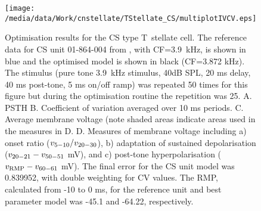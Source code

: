 
\begin{figure}[htb]
\centering%
\texttt{[image: /media/data/Work/cnstellate/TStellate\_CS/multiplotIVCV.eps]}
\caption[CS T~stellate Optimisation results]{Optimisation results for the CS type T~stellate cell.
The reference data for CS unit 01-864-004 from  \citep{PaoliniClareyEtAl:2005}, with CF=3.9~kHz, is shown in blue and the     optimised model is shown in black (CF=3.872 kHz).
The stimulus (pure tone  3.9~kHz stimulus, 40dB SPL, 20 ms delay, 40 ms post-tone, 5 ms on/off ramp)  was repeated 50 times for this figure but during the optimisation routine the  repetition was 25.
A. PSTH B. Coefficient of variation averaged over 10 ms periods.
C. Average membrane voltage (note shaded areas indicate areas used in the measures in D.
D. Measures of membrane voltage including a) onset ratio ($v_{\rm 5-10}/v_{\rm 20-30}$), b) adaptation of sustained depolarisation ($v_{\rm 20-21} - v_{\rm 50-51}$ mV), and c) post-tone hyperpolarisation ($v_{\rm RMP} - v_{\rm 60-61}$ mV).
The final error for the CS unit model was 0.839952, with double weighting for CV values.
The RMP, calculated from -10 to 0 ms, for the reference unit and best parameter model was -45.1 and -64.22, respectively.}
  \label{fig:CSresults}
\end{figure}


